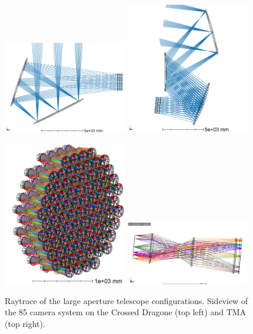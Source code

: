 \documentclass{article}
\begin{document}
\begin{figure}

	\includegraphics[width=0.48\textwidth]{CD_3DLayout.png}
	\includegraphics[width=0.48\textwidth]{TMP_3DLayout.png}
	
	\includegraphics[width=0.48\textwidth]{TMP_cams.PNG}
	\includegraphics[width=0.48\textwidth]{TMP_cam1_layout.PNG}	
	
	\caption{Raytrace of the large aperture telescope configurations. Sideview of the 85 camera system on the Crossed Dragone (top left) and TMA (top right).}
	\label{fig:opticsDesign}
\end{figure}
\end{document}
